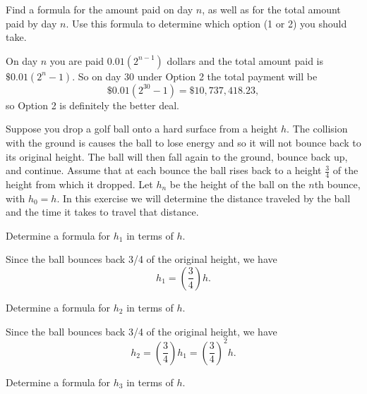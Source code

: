 \begin{exercises}
    \item Find a formula for the amount paid on day $n$, as well as for the total amount paid by day $n$. Use this formula to determine which option (1 or 2) you should take.

\begin{exerciseSolution}

On day $n$ you are paid $0.01\left(2^{n-1}\right)$ dollars and the total amount paid is $\$0.01\left(2^n-1\right)$. So on day 30 under Option 2 the total payment will be
\[\$0.01\left(2^{30}-1\right) = \$10,737,418.23,\]
so Option 2 is definitely the better deal.

\end{exerciseSolution}



\ea

\item  Suppose you drop a golf ball onto a hard surface from a height $h$. The collision with the ground is causes the ball to lose energy and so it will not bounce back to its original height. The ball will then fall again to the ground, bounce back up, and continue. Assume that at each bounce the ball rises back to a height $\frac{3}{4}$ of the height from which it dropped. Let $h_n$ be the height of the ball on the $n$th bounce, with $h_0 = h$. In this exercise we will determine the distance traveled by the ball and the time it takes to travel that distance.

\ba
\item Determine a formula for $h_1$ in terms of $h$.

\begin{exerciseSolution}

Since the ball bounces back 3/4 of the original height, we have
\[h_1 = \left(\frac{3}{4}\right)h.\]

\end{exerciseSolution}

\item Determine a formula for $h_2$ in terms of $h$.

\begin{exerciseSolution}

Since the ball bounces back 3/4 of the original height, we have
\[h_2 = \left(\frac{3}{4}\right)h_1 = \left(\frac{3}{4}\right)^2h.\]

\end{exerciseSolution}

\item Determine a formula for $h_3$ in terms of $h$.


\end{exercises}
